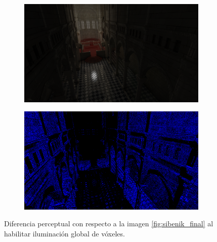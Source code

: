 \begin{figure}[H]
	\centering
	\begin{subfigure}[b]{.49\linewidth}
		\centering
		\captionsetup{justification=centering}
		\includegraphics[width=\linewidth]{media/finals/sibenik_vgi.png}
	\end{subfigure}%
	\hspace{0.01\textwidth}
	\begin{subfigure}[b]{.49\linewidth}
		\centering
		\captionsetup{justification=centering}
		\includegraphics[width=\linewidth]{media/finals/sibenik_vgi_diff.png}
	\end{subfigure}%
	\caption{Diferencia perceptual con respecto a la imagen \ref{fig:sibenik_final} al habilitar iluminación global de vóxeles.}
	\label{fig:sibenik_vgi_diff}
\end{figure}
